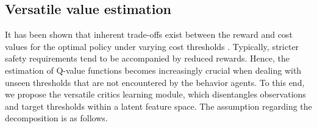 \subsection{Versatile value estimation}
\label{subsection: versatile critics learning}
It has been shown that inherent trade-offs exist between the reward and cost values for the optimal policy under varying cost thresholds \cite{liu2022robustness}.
Typically, stricter safety requirements tend to be accompanied by reduced rewards.
Hence, the estimation of Q-value functions becomes increasingly crucial when dealing with unseen thresholds that are not encountered by the behavior agents.
To this end, we propose the versatile critics learning module, which disentangles observations and target thresholds within a latent feature space. The assumption regarding the decomposition is as follows. 
